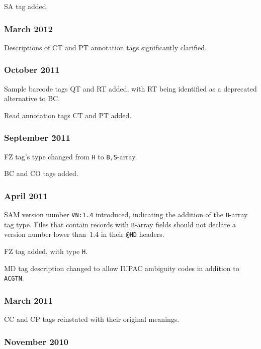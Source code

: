 \documentclass[10pt]{article}
\begin{document}
\begin{appendices}
\gap
SA tag added.

\subsubsection*{March 2012}

Descriptions of CT and PT annotation tags significantly clarified.

\subsubsection*{October 2011}

Sample barcode tags QT and RT added, with RT being identified as a deprecated alternative to BC.

Read annotation tags CT and PT added.

\subsubsection*{September 2011}

FZ tag's type changed from {\tt H} to {\tt B,S}-array.

BC and CO tags added.

\subsubsection*{April 2011}

SAM version number {\tt VN:1.4} introduced, indicating the addition of the {\tt B}-array tag type.
Files that contain records with {\tt B}-array fields should not declare a version number lower than~1.4 in their {\tt @HD} headers.

\gap
FZ tag added, with type {\tt H}.

MD tag description changed to allow IUPAC ambiguity codes in addition to {\tt ACGTN}.

\subsubsection*{March 2011}

CC and CP tags reinstated with their original meanings.

\subsubsection*{November 2010}


\end{appendices}
\end{document}
